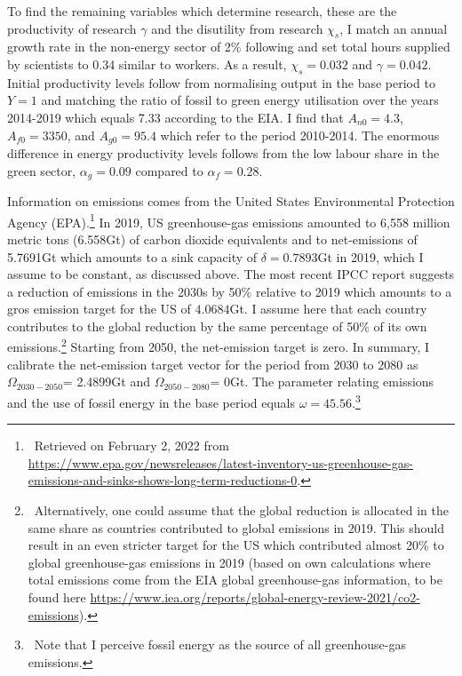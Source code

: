  To find the remaining variables which determine research, these are  the productivity of research $\gamma$ and the disutility from research $\chi_s$, I match an annual growth rate in the non-energy sector of 2\% following \cite{Fried2018ClimateAnalysis} and set total hours supplied by scientists to 0.34 similar to workers. As a result,  $\chi_s=0.032$ and $\gamma=0.042$. Initial productivity levels follow from normalising output in the base period to $Y=1$ and matching the ratio of fossil to green energy utilisation over the years 2014-2019 which equals 7.33 according to the EIA. I find that $A_{n0}=4.3$, $A_{f0}=3350$, and $A_{g0}=95.4$ which refer to the period 2010-2014. The enormous difference in energy productivity levels follows from the low labour share in the green sector, $\alpha_g=0.09$ compared to $\alpha_f= 0.28$. 
 
Information on emissions comes from the United States Environmental Protection Agency (EPA).\footnote{\ Retrieved on February 2, 2022 from  \url{https://www.epa.gov/newsreleases/latest-inventory-us-greenhouse-gas-emissions-and-sinks-shows-long-term-reductions-0}. } In 2019, US greenhouse-gas emissions amounted to 6,558 million metric tons (6.558Gt) of carbon dioxide equivalents and to net-emissions of 5.7691Gt which amounts to a sink capacity of $\delta=0.7893$Gt in 2019, which I assume to be constant, as discussed above. %
The most recent IPCC report \citep{IPCC2022} suggests a reduction of emissions in the 2030s by 50\% relative to 2019 which amounts to a gros emission target for the US of  $4.0684$Gt. I assume here that each country contributes to the global reduction by the same percentage of 50\% of its own emissions.\footnote{\ Alternatively, one could assume that the global reduction is allocated in the same share as countries contributed to global emissions in 2019. This should result in an even stricter target for the US which contributed almost 20\% to global greenhouse-gas emissions in 2019 (based on own calculations where total emissions come from the EIA global greenhouse-gas information, to be found here \url{https://www.iea.org/reports/global-energy-review-2021/co2-emissions}).}
Starting from 2050, the net-emission target is zero. In summary, I calibrate the net-emission target vector for the period from 2030 to 2080 as
$\Omega_{2030-2050}$= 2.4899Gt and $\Omega_{2050-2080}$= 0Gt. The parameter relating emissions and the use of fossil energy in the base period equals $\omega=45.56$.\footnote{\ Note that I perceive fossil energy as the source of all greenhouse-gas emissions.}  

